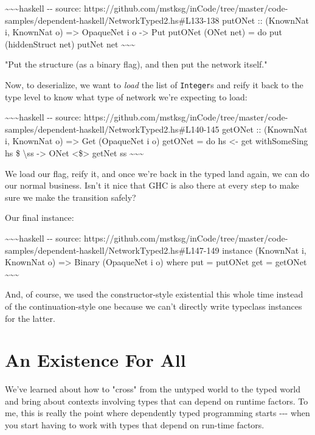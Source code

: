\documentclass[]{article}
\begin{document}
\textasciitilde{}\textasciitilde{}\textasciitilde{}haskell -\/- source:
https://github.com/mstksg/inCode/tree/master/code-samples/dependent-haskell/NetworkTyped2.hs\#L133-138
putONet :: (KnownNat i, KnownNat o) =\textgreater{} OpaqueNet i o
-\textgreater{} Put putONet (ONet net) = do put (hiddenStruct net) putNet net
\textasciitilde{}\textasciitilde{}\textasciitilde{}

"Put the structure (as a binary flag), and then put the network itself."

Now, to deserialize, we want to \emph{load} the list of \texttt{Integer}s and
reify it back to the type level to know what type of network we're expecting to
load:

\textasciitilde{}\textasciitilde{}\textasciitilde{}haskell -\/- source:
https://github.com/mstksg/inCode/tree/master/code-samples/dependent-haskell/NetworkTyped2.hs\#L140-145
getONet :: (KnownNat i, KnownNat o) =\textgreater{} Get (OpaqueNet i o) getONet
= do hs \textless{}- get withSomeSing hs \$ \textbackslash{}ss -\textgreater{}
ONet \textless{}\$\textgreater{} getNet ss
\textasciitilde{}\textasciitilde{}\textasciitilde{}

We load our flag, reify it, and once we're back in the typed land again, we can
do our normal business. Isn't it nice that GHC is also there at every step to
make sure we make the transition safely?

Our final instance:

\textasciitilde{}\textasciitilde{}\textasciitilde{}haskell -\/- source:
https://github.com/mstksg/inCode/tree/master/code-samples/dependent-haskell/NetworkTyped2.hs\#L147-149
instance (KnownNat i, KnownNat o) =\textgreater{} Binary (OpaqueNet i o) where
put = putONet get = getONet \textasciitilde{}\textasciitilde{}\textasciitilde{}

And, of course, we used the constructor-style existential this whole time
instead of the continuation-style one because we can't directly write typeclass
instances for the latter.

\section{An Existence For All}

We've learned about how to "cross" from the untyped world to the typed world and
bring about contexts involving types that can depend on runtime factors. To me,
this is really the point where dependently typed programming starts -\/-\/- when
you start having to work with types that depend on run-time factors.
\end{document}
